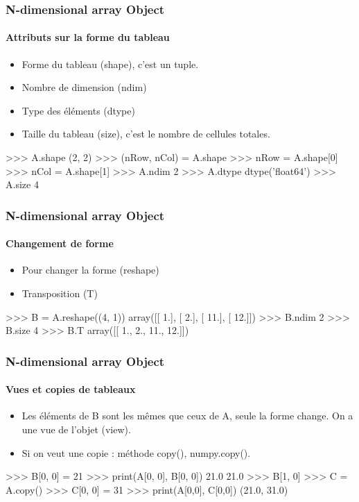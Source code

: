 \begin{frame}[fragile]
\frametitle{N-dimensional array Object}
\framesubtitle{Attributs sur la forme du tableau}
\begin{itemize}
 \item Forme du tableau (shape), c'est un tuple.  
 \item Nombre de dimension (ndim)
 \item Type des éléments (dtype)
 \item Taille du tableau (size), c'est le nombre de cellules totales. 
\end{itemize}
\begin{pythonConsole}
>>> A.shape
(2, 2)
>>> (nRow, nCol) = A.shape
>>> nRow = A.shape[0]
>>> nCol = A.shape[1]
>>> A.ndim
2
>>> A.dtype
dtype('float64')
>>> A.size
4
\end{pythonConsole}
\end{frame}
\begin{frame}[fragile]
\frametitle{N-dimensional array Object}
\framesubtitle{Changement de forme}
\begin{itemize}
 \item Pour changer la forme (reshape)
 \item Transposition (T)
\end{itemize}
\begin{pythonConsole}
>>> B = A.reshape((4, 1))
array([[  1.],
       [  2.],
       [ 11.],
       [ 12.]])
>>> B.ndim
2
>>> B.size
4
>>> B.T
array([[ 1.,   2.,  11.,  12.]])
\end{pythonConsole}
\end{frame}
\begin{frame}[fragile]
\frametitle{N-dimensional array Object}
\framesubtitle{Vues et copies de tableaux}
\begin{itemize}
 \item Les éléments de B sont les mêmes que ceux de A, seule la forme change. On a une vue de l'objet (view).   
 \item Si on veut une copie : méthode copy(), numpy.copy().
\end{itemize}
\begin{pythonConsole}
>>> B[0, 0] = 21
>>> print(A[0, 0], B[0, 0])
21.0 21.0
>>> B[1, 0]
>>> C = A.copy()
>>> C[0, 0] = 31
>>> print(A[0,0], C[0,0])
(21.0, 31.0)
\end{pythonConsole}
\end{frame}
